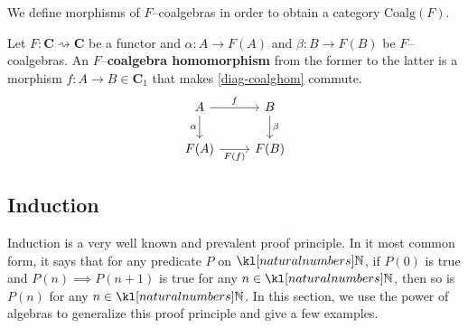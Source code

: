 \documentclass[main.tex]{subfiles}
\begin{document}
We define morphisms of $F$--coalgebras in order to obtain a category $\text{Coalg}(F)$.
\begin{defn}
	Let $F:\mathbf{C}\rightsquigarrow \mathbf{C}$ be a functor and $\alpha: A \rightarrow F(A)$ and $\beta:B \rightarrow F(B)$ be $F$--coalgebras. An $F$--\textbf{coalgebra homomorphism} from the former to the latter is a morphism $f:A\rightarrow B \in \mathbf{C}_1$ that makes \eqref{diag-coalghom} commute.
	\begin{equation}\label{diag-coalghom}
		\centering
		\begin{tikzcd}
			A \arrow[r, "f"] \arrow[d, "\alpha"'] & B \arrow[d, "\beta"] \\
			F(A) \arrow[r, "F(f)"']               & F(B)                
		\end{tikzcd}
	\end{equation}
\end{defn}

\subsection{Induction}
Induction is a very well known and prevalent proof principle. In it most common form, it says that for any predicate $P$ on $\N$, if $P(0)$ is true and $P(n) \implies P(n+1)$ is true for any $n \in \N$, then so is $P(n)$ for any $n\in \N$. In this section, we use the power of algebras to generalize this proof principle and give a few examples.
\end{document}
